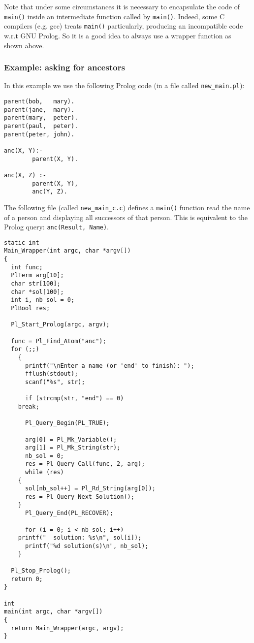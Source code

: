 Note that under some circumstances it is necessary to encapsulate the code of
\texttt{main()} inside an intermediate function called by
\texttt{main()}. Indeed, some C compilers (e.g. gcc) treats \texttt{main()}
particularly, producing an incompatible code w.r.t GNU Prolog. So it is a
good idea to always use a wrapper function as shown above.

\subsubsection{Example: asking for ancestors}

In this example we use the following Prolog code (in a file called
\texttt{new\_main.pl}):

\begin{Indentation}
\begin{verbatim}
parent(bob,   mary).
parent(jane,  mary).
parent(mary,  peter).
parent(paul,  peter).
parent(peter, john).

anc(X, Y):-
        parent(X, Y).

anc(X, Z) :-
        parent(X, Y),
        anc(Y, Z).
\end{verbatim}
\end{Indentation}

The following file (called \texttt{new\_main\_c.c}) defines a \texttt{main()}
function read the name of a person and displaying all successors of that
person. This is equivalent to the Prolog query: \texttt{anc(Result, Name)}.

\begin{Indentation}
\begin{verbatim}
static int
Main_Wrapper(int argc, char *argv[])
{
  int func;
  PlTerm arg[10];
  char str[100];
  char *sol[100];
  int i, nb_sol = 0;
  PlBool res;

  Pl_Start_Prolog(argc, argv);

  func = Pl_Find_Atom("anc");
  for (;;)
    {
      printf("\nEnter a name (or 'end' to finish): ");
      fflush(stdout);
      scanf("%s", str);

      if (strcmp(str, "end") == 0)
	break;

      Pl_Query_Begin(PL_TRUE);

      arg[0] = Pl_Mk_Variable();
      arg[1] = Pl_Mk_String(str);
      nb_sol = 0;
      res = Pl_Query_Call(func, 2, arg);
      while (res)
	{
	  sol[nb_sol++] = Pl_Rd_String(arg[0]);
	  res = Pl_Query_Next_Solution();
	}
      Pl_Query_End(PL_RECOVER);

      for (i = 0; i < nb_sol; i++)
	printf("  solution: %s\n", sol[i]);
      printf("%d solution(s)\n", nb_sol);
    }

  Pl_Stop_Prolog();
  return 0;
}

int
main(int argc, char *argv[])
{
  return Main_Wrapper(argc, argv);
}
\end{verbatim}
\end{Indentation}

